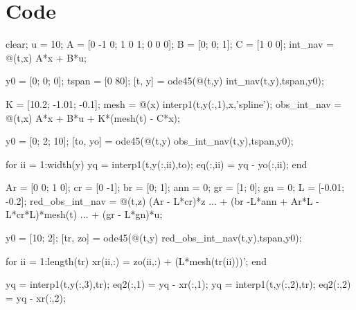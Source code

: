 
\section*{Code}

\begin{matlabcode}
clear;
u = 10;
A = [0 -1 0; 1 0 1; 0 0 0];
B = [0; 0; 1]; C = [1 0 0];
int_nav = @(t,x) A*x + B*u;

y0 = [0; 0; 0]; %
tspan = [0 80]; %
[t, y] = ode45(@(t,y) int_nav(t,y),tspan,y0);
\end{matlabcode}



\begin{matlabcode}
K = [10.2; -1.01; -0.1];
mesh = @(x) interp1(t,y(:,1),x,'spline');
obs_int_nav = @(t,x) A*x + B*u + K*(mesh(t) - C*x);

y0 = [0; 2; 10]; %
[to, yo] = ode45(@(t,y) obs_int_nav(t,y),tspan,y0); 

for ii = 1:width(y)
    yq = interp1(t,y(:,ii),to);
    eq(:,ii) = yq - yo(:,ii);
end
\end{matlabcode}



\begin{matlabcode}
Ar = [0 0; 1 0];
cr = [0 -1];
br = [0; 1];
ann = 0;
gr = [1; 0];
gn = 0;
L = [-0.01; -0.2];
red_obs_int_nav = @(t,z) (Ar - L*cr)*z ... 
                  + (br -L*ann + Ar*L - L*cr*L)*mesh(t) ...
                  + (gr - L*gn)*u;

y0 = [10; 2]; %
[tr, zo] = ode45(@(t,y) red_obs_int_nav(t,y),tspan,y0); 

for ii = 1:length(tr)
    xr(ii,:) = zo(ii,:) + (L*mesh(tr(ii)))';
end

yq = interp1(t,y(:,3),tr);
eq2(:,1) = yq - xr(:,1);
yq = interp1(t,y(:,2),tr);
eq2(:,2) = yq - xr(:,2);
\end{matlabcode}